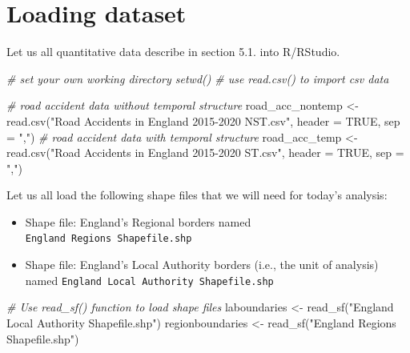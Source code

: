 \documentclass[
]{book}
\newenvironment{Shaded}{\begin{snugshade}}{\end{snugshade}}
\newcommand{\AttributeTok}[1]{\textcolor[rgb]{0.77,0.63,0.00}{#1}}
\newcommand{\CommentTok}[1]{\textcolor[rgb]{0.56,0.35,0.01}{\textit{#1}}}
\newcommand{\ConstantTok}[1]{\textcolor[rgb]{0.00,0.00,0.00}{#1}}
\newcommand{\FunctionTok}[1]{\textcolor[rgb]{0.00,0.00,0.00}{#1}}
\newcommand{\NormalTok}[1]{#1}
\newcommand{\OtherTok}[1]{\textcolor[rgb]{0.56,0.35,0.01}{#1}}
\newcommand{\StringTok}[1]{\textcolor[rgb]{0.31,0.60,0.02}{#1}}
\providecommand{\tightlist}{%
  \setlength{\itemsep}{0pt}\setlength{\parskip}{0pt}}
\begin{document}
\hypertarget{loading-dataset}{%
\section{Loading dataset}\label{loading-dataset}}

Let us all quantitative data describe in section 5.1. into R/RStudio.

\begin{Shaded}
\begin{Highlighting}[]
\CommentTok{\# set your own working directory setwd()}
\CommentTok{\# use read.csv() to import csv data}

\CommentTok{\# road accident data without temporal structure}
\NormalTok{road\_acc\_nontemp }\OtherTok{\textless{}{-}} \FunctionTok{read.csv}\NormalTok{(}\StringTok{"Road Accidents in England 2015{-}2020 NST.csv"}\NormalTok{, }\AttributeTok{header =} \ConstantTok{TRUE}\NormalTok{, }\AttributeTok{sep =} \StringTok{","}\NormalTok{)}
\CommentTok{\# road accident data with temporal structure}
\NormalTok{road\_acc\_temp }\OtherTok{\textless{}{-}} \FunctionTok{read.csv}\NormalTok{(}\StringTok{"Road Accidents in England 2015{-}2020 ST.csv"}\NormalTok{, }\AttributeTok{header =} \ConstantTok{TRUE}\NormalTok{, }\AttributeTok{sep =} \StringTok{","}\NormalTok{)}
\end{Highlighting}
\end{Shaded}

Let us all load the following shape files that we will need for today's analysis:

\begin{itemize}
\tightlist
\item
  Shape file: England's Regional borders named \texttt{England\ Regions\ Shapefile.shp}
\item
  Shape file: England's Local Authority borders (i.e., the unit of analysis) named \texttt{England\ Local\ Authority\ Shapefile.shp}
\end{itemize}

\begin{Shaded}
\begin{Highlighting}[]
\CommentTok{\# Use read\_sf() function to load shape files }
\NormalTok{laboundaries }\OtherTok{\textless{}{-}} \FunctionTok{read\_sf}\NormalTok{(}\StringTok{"England Local Authority Shapefile.shp"}\NormalTok{)}
\NormalTok{regionboundaries }\OtherTok{\textless{}{-}} \FunctionTok{read\_sf}\NormalTok{(}\StringTok{"England Regions Shapefile.shp"}\NormalTok{)}
\end{Highlighting}
\end{Shaded}
\end{document}
